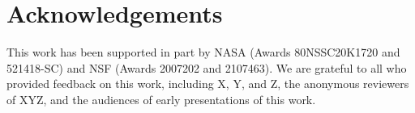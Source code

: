 \section*{Acknowledgements} This work has been supported in part by NASA (Awards 80NSSC20K1720 and 521418-SC) and NSF (Awards 2007202 and 2107463). We are grateful to all who provided feedback on this work, including X, Y, and Z, the anonymous reviewers of XYZ, and the audiences of early presentations of this work.